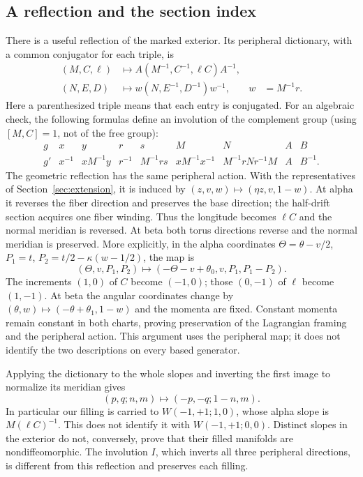 \documentclass[11pt]{amsart}
\theoremstyle{definition}
\theoremstyle{remark}
\begin{document}
\subsection{A reflection and the section index}
There is a useful reflection of the marked exterior. Its peripheral
dictionary, with a common conjugator for each triple, is
\begin{equation}\label{eq:reflection-dictionary}
\begin{aligned}
 (M,C,\ell)&\longmapsto A(M^{-1},C^{-1},\ell C)A^{-1},\\
 (N,E,D)&\longmapsto w(N,E^{-1},D^{-1})w^{-1},
                  &w&=M^{-1}r.
\end{aligned}
\end{equation}
Here a parenthesized triple means that each entry is conjugated.
For an algebraic check, the following formulas define an involution
of the complement group (using $[M,C]=1$, not of the free group):
\[
\begin{array}{c|cccccccc}
g&x&y&r&s&M&N&A&B\\ \hline
g'&x^{-1}&xM^{-1}y&r^{-1}&M^{-1}rs&xM^{-1}x^{-1}
 &M^{-1}rNr^{-1}M&A&B^{-1}.
\end{array}
\]
The geometric reflection has the same peripheral action. With the
representatives of Section~\ref{sec:extension}, it is induced by
$(z,v,w)\mapsto(\eta z,v,1-w)$. At alpha it reverses the
fiber direction and preserves the base direction; the half-drift
section acquires one fiber winding. Thus the longitude becomes
$\ell C$ and the normal meridian is reversed. At beta both torus
directions reverse and the normal meridian is preserved. More explicitly, in the alpha coordinates
$\Theta=\theta-v/2$, $P_1=t$, $P_2=t/2-\kappa(w-1/2)$, the map is
\[
 (\Theta,v,P_1,P_2)\longmapsto
 (-\Theta-v+\theta_0,v,P_1,P_1-P_2).
\]
The increments $(1,0)$ of $C$ become $(-1,0)$; those $(0,-1)$
of $\ell$ become $(1,-1)$. At beta the angular coordinates change
by $(\theta,w)\mapsto(-\theta+\theta_1,1-w)$ and the momenta are
fixed. Constant momenta remain constant in both charts, proving
preservation of the Lagrangian framing and the peripheral action. This argument uses the peripheral map;
it does not identify the two descriptions on every based generator.

Applying the dictionary to the whole slopes and inverting the first
image to normalize its meridian gives
\begin{equation}\label{eq:reflection-parameters}
                (p,q;n,m)\longmapsto(-p,-q;1-n,m).
\end{equation}
In particular our filling is carried to $W(-1,+1;1,0)$, whose
alpha slope is $M(\ell C)^{-1}$. This does not identify it with
$W(-1,+1;0,0)$. Distinct slopes in the exterior do not, conversely,
prove that their filled manifolds are nondiffeomorphic.
The involution $I$, which inverts all three peripheral directions,
is different from this reflection and preserves each filling.
\end{document}

